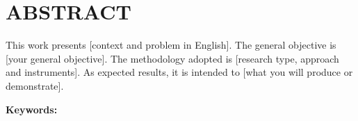 \chapter*{ABSTRACT}

This work presents [context and problem in English].
The general objective is [your general objective].
The methodology adopted is [research type, approach and instruments].
As expected results, it is intended to [what you will produce or demonstrate].

\vspace{0.5cm}
\noindent\textbf{Keywords:} \okeywords
\cleardoublepage
